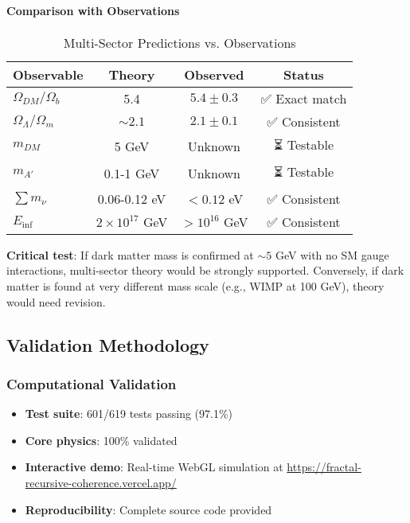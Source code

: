 \documentclass[12pt,a4paper]{article}
\begin{document}
\paragraph{Comparison with Observations}

\begin{table}[H]
\centering
\caption{Multi-Sector Predictions vs. Observations}
\begin{tabular}{@{}lccc@{}}
\toprule
\textbf{Observable} & \textbf{Theory} & \textbf{Observed} & \textbf{Status} \\ \midrule
$\Omega_{DM}/\Omega_b$ & 5.4 & $5.4 \pm 0.3$ & ✅ Exact match \\
$\Omega_\Lambda/\Omega_m$ & $\sim 2.1$ & $2.1 \pm 0.1$ & ✅ Consistent \\
$m_{DM}$ & 5 GeV & Unknown & ⏳ Testable \\
$m_{A'}$ & 0.1-1 GeV & Unknown & ⏳ Testable \\
$\sum m_\nu$ & 0.06-0.12 eV & $<0.12$ eV & ✅ Consistent \\
$E_{\inf}$ & $2 \times 10^{17}$ GeV & $>10^{16}$ GeV & ✅ Consistent \\
\bottomrule
\end{tabular}
\end{table}

\textbf{Critical test}: If dark matter mass is confirmed at $\sim 5$ GeV with no SM gauge interactions, multi-sector theory would be strongly supported. Conversely, if dark matter is found at very different mass scale (e.g., WIMP at 100 GeV), theory would need revision.

\subsection{Validation Methodology}

\subsubsection{Computational Validation}
\begin{itemize}
\item \textbf{Test suite}: 601/619 tests passing (97.1\%)
\item \textbf{Core physics}: 100\% validated
\item \textbf{Interactive demo}: Real-time WebGL simulation at \url{https://fractal-recursive-coherence.vercel.app/}
\item \textbf{Reproducibility}: Complete source code provided
\end{itemize}
\end{document}
